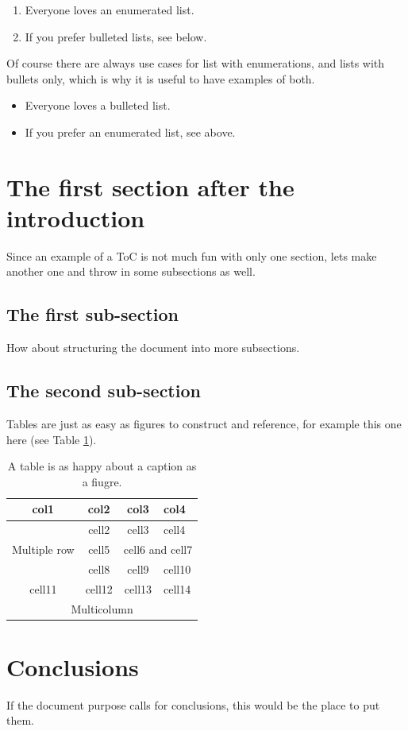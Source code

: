 \documentclass{smarthepnote}
\begin{document}
\begin{enumerate}
\item Everyone loves an enumerated list.
\item If you prefer bulleted lists, see below.
\end{enumerate}

Of course there are always use cases for list with enumerations, and lists with bullets only, which is why it is useful to have examples of both.

\begin{itemize}
    \item Everyone loves a bulleted list.
    \item If you prefer an enumerated list, see above.
\end{itemize}

\section{The first section after the introduction}
Since an example of a ToC is not much fun with only one section, lets make another one and throw in some subsections as well.


\subsection{The first sub-section}
How about structuring the document into more subsections.

\subsection{The second sub-section}
Tables are just as easy as figures to construct and reference, for example this one here (see Table \ref{tab:exampletable}).

\begin{table}[h]
\begin{center}
\begin{tabular}{ |c|c|c|p{}| } 
    \hline
    \rowcolor{lightgray} 
    col1 & col2 & col3 & col4\\
    \hline
    \multirow{3}{4em}{Multiple row} & cell2 & cell3 & cell4 \\ 
    \cline{3-4}
    & cell5 & \multicolumn{2}{c|}{cell6 and cell7} \\
    \cline{3-4}
    & cell8 & cell9 & cell10 \\ 
    \hline
    cell11 & cell12 & cell13 & cell14 \\ 
    \hline
    \multicolumn{4}{|c|}{ Multicolumn} \\
    \hline
\end{tabular}
\end{center}
\caption{A table is as happy about a caption as a fiugre.}
\label{tab:exampletable}
\end{table}

\section{Conclusions}
If the document purpose calls for conclusions, this would be the place to put them.



\end{document}
